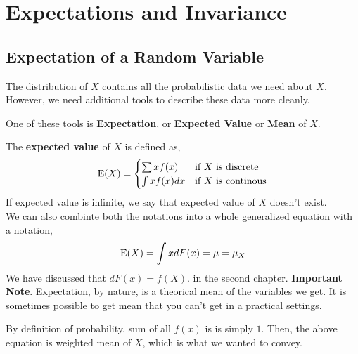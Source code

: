 \chapter{Expectations and Invariance}
\section{Expectation of a Random Variable}
The distribution of $X$ contains all the probabilistic data we need about $X$. However, we need additional tools to describe these data more cleanly. 
\par
One of these tools is \textbf{Expectation}, or \textbf{Expected Value} or \textbf{Mean} of $X$.
\begin{definition}
    The \textbf{expected value} of $X$ is defined as,
    \[\operatorname{E}(X)= \begin{cases}
        \sum xf(x)& \text{if $X$ is discrete} \\
        \int xf(x)dx &\text{if $X$ is continous}
    \end{cases}\]
    If expected value is infinite, we say that expected value of $X$ doesn't exist.\\
    We can also combinte both the notations into a whole generalized equation with a notation,
    \[\operatorname{E}(X) = \int x dF(x)= \mu = \mu_X\]
    We have discussed that $dF(x) = f(X)$. in the second chapter.
    \textbf{Important Note}. Expectation, by nature, is a theorical mean of the variables we get. It is sometimes possible to get mean that you can't get in a practical settings.
\end{definition}
By definition of probability, sum of all $f(x)$ is is simply $1$. Then, the above equation is weighted mean of $X$, which is what we wanted to convey.

